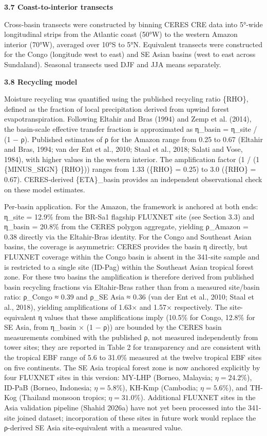 \textbf{3.7 Coast-to-interior transects}

Cross-basin transects were constructed by binning CERES CRE data into
5°-wide longitudinal strips from the Atlantic coast (50°W) to the
western Amazon interior (70°W), averaged over 10°S to 5°N. Equivalent
transects were constructed for the Congo (longitude west to east) and SE
Asian basins (west to east across Sundaland). Seasonal transects used
DJF and JJA means separately.

\textbf{3.8 Recycling model}

Moisture recycling was quantified using the published recycling ratio
\{RHO\}, defined as the fraction of local precipitation derived from
upwind forest evapotranspiration. Following Eltahir and Bras (1994) and
Zemp et al. (2014), the basin-scale effective transfer fraction is
approximated as η\_basin = η\_site / (1 − ρ). Published estimates of ρ
for the Amazon range from 0.25 to 0.67 (Eltahir and Bras, 1994; van der
Ent et al., 2010; Staal et al., 2018; Salati and Vose, 1984), with
higher values in the western interior. The amplification factor (1 /
(1 \{MINUS\_SIGN\} \{RHO\})) ranges from 1.33 (\{RHO\} = 0.25) to 3.0
(\{RHO\} = 0.67). CERES-derived \{ETA\}\_basin provides an independent
observational check on these model estimates.

Per-basin application. For the Amazon, the framework is anchored at
both ends: η\_site = 12.9\% from the BR-Sa1 flagship FLUXNET site (see
Section 3.3) and η\_basin = 20.8\% from the CERES polygon aggregate,
yielding ρ\_Amazon = 0.38 directly via the Eltahir-Bras identity. For
the Congo and Southeast Asian basins, the coverage is asymmetric:
CERES provides the basin η directly, but FLUXNET coverage within the
Congo basin is absent in the 341-site sample and is restricted to a
single site (ID-Pag) within the Southeast Asian tropical forest zone.
For these two basins the amplification is therefore derived from
published basin recycling fractions via Eltahir-Bras rather than from
a measured site/basin ratio: ρ\_Congo ≈ 0.39 and ρ\_SE Asia ≈ 0.36
(van der Ent et al., 2010; Staal et al., 2018), yielding amplifications
of 1.63× and 1.57× respectively. The site-equivalent η values that
these amplifications imply (10.5\% for Congo, 12.8\% for SE Asia, from
η\_basin × (1 − ρ)) are bounded by the CERES basin measurements
combined with the published ρ, not measured independently from tower
sites; they are reported in Table 2 for transparency and are
consistent with the tropical EBF range of 5.6 to 31.0\% measured at
the twelve tropical EBF sites on five continents. The SE Asia tropical
forest zone is now anchored explicitly by four FLUXNET sites in this
version: MY-LHP (Borneo, Malaysia; $\eta = 24.2\%$), ID-PaB (Borneo,
Indonesia; $\eta = 5.8\%$), KH-Kmp (Cambodia; $\eta = 5.6\%$), and
TH-Kog (Thailand monsoon tropics; $\eta = 31.0\%$). Additional FLUXNET
sites in the Asia validation pipeline (Shahid 2026a) have not yet been
processed into the 341-site
joined dataset; incorporation of these sites in future work would
replace the ρ-derived SE Asia site-equivalent with a measured value.

